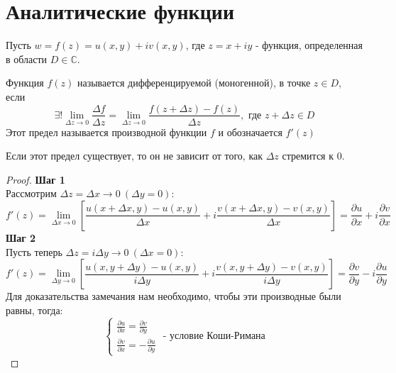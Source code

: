 \section{Аналитические функции}

Пусть $w = f(z) = u(x, y) + iv(x,y)$, где $z = x + iy$ - функция, определенная в области $D \in \mathbb{C}$.

\begin{definition}
    Функция $f(z)$ называется дифференцируемой (моногенной), в точке $z \in D$, 
    если 
    \[\exists! \lim_{\Delta z \to 0} \frac{\Delta f}{\Delta z} = \lim_{\Delta z \to 0} \frac{f(z + \Delta z) - f(z)}{\Delta z}, \text{ где $z+ \Delta z \in D$}\]
    Этот предел называется производной функции $f$ и обозначается $f'(z)$
\end{definition}


\begin{note}
    Если этот предел существует, то он не зависит от того, как $\Delta z$ стремится к $0$.

    \begin{proof}
        \textbf{Шаг 1}\\
        Рассмотрим $\Delta z = \Delta x \to 0 \ (\Delta y = 0)$:
        \[f'(z) = \lim_{\Delta x \to 0} \left[\frac{u(x + \Delta x, y) - u(x, y)}{\Delta x} + i \frac{v(x + \Delta x, y) - v(x, y)}{\Delta x}\right] = \frac{\partial u}{\partial x} + i \frac{\partial v}{\partial x}\]
        \textbf{Шаг 2}\\
        Пусть теперь $\Delta z = i \Delta y \to 0 \ (\Delta x = 0)$:
        \[f'(z) = \lim_{\Delta y \to 0} \left[\frac{u(x, y+\Delta y) - u(x, y)}{i\Delta y} + i\frac{v(x, y+\Delta y) - v(x, y)}{i\Delta y}\right] = \frac{\partial v}{\partial y} - i \frac{\partial u}{\partial y}\]
        Для доказательства замечания нам необходимо, чтобы эти производные были равны, тогда:
        \[\begin{cases*}
            \frac{\partial u}{\partial x} = \frac{\partial v}{\partial y}\\
            \frac{\partial v}{\partial x} = -\frac{\partial u}{\partial y}
        \end{cases*} \text{ - условие Коши-Римана}\]
    \end{proof}
\end{note}

